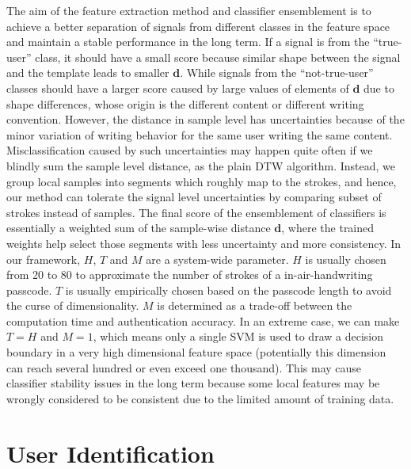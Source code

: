 \documentclass[conference]{IEEEtran}
\begin{document}
The aim of the feature extraction method and classifier ensemblement is to achieve a better separation of signals from different classes in the feature space and maintain a stable performance in the long term. If a signal is from the ``true-user'' class, it should have a small score because similar shape between the signal and the template leads to smaller $\mathbf{d}$. While signals from the ``not-true-user'' classes should have a larger score caused by large values of elements of $\mathbf{d}$ due to shape differences, whose origin is the different content or different writing convention. However, the distance in sample level has uncertainties because of the minor variation of writing behavior for the same user writing the same content. Misclassification caused by such uncertainties may happen quite often if we blindly sum the sample level distance, as the plain DTW algorithm. Instead, we group local samples into segments which roughly map to the strokes, and hence, our method can tolerate the signal level uncertainties by comparing subset of strokes instead of samples. The final score of the ensemblement of classifiers is essentially a weighted sum of the sample-wise distance $\mathbf{d}$, where the trained weights help select those segments with less uncertainty and more consistency. In our framework, $H$, $T$ and $M$ are a system-wide parameter. $H$ is usually chosen from 20 to 80 to approximate the number of strokes of a in-air-handwriting passcode. $T$ is usually empirically chosen based on the passcode length to avoid the curse of dimensionality. $M$ is determined as a trade-off between the computation time and authentication accuracy. In an extreme case, we can make $T = H$ and $M = 1$, which means only a single SVM is used to draw a decision boundary in a very high dimensional feature space (potentially this dimension can reach several hundred or even exceed one thousand). This may cause classifier stability issues in the long term because some local features may be wrongly considered to be consistent due to the limited amount of training data.


\section{User Identification}
\end{document}

